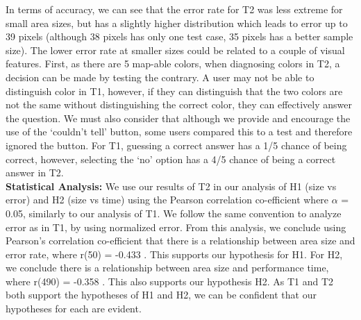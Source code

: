 In terms of accuracy, we can see that the error rate for T2 was less extreme for small area sizes, but has a slightly higher distribution which leads to error up to 39 pixels (although 38 pixels has only one test case, 35 pixels has a better sample size). The lower error rate at smaller sizes could be related to a couple of visual features. First, as there are 5 map-able colors, when diagnosing colors in T2, a decision can be made by testing the contrary. A user may not be able to distinguish color in T1, however, if they can distinguish that the two colors are not the same without distinguishing the correct color, they can effectively answer the question. We must also consider that although we provide and encourage the use of the `couldn't tell' button, some users compared this to a test and therefore ignored the button. For T1, guessing a correct answer has a 1/5 chance of being correct, however, selecting the `no' option has a 4/5 chance of being a correct answer in T2.\\
\textbf{Statistical Analysis: } We use our results of T2 in our analysis of H1 (size vs error) and H2 (size vs time) using the Pearson correlation co-efficient where $\alpha$ = 0.05, similarly to our analysis of T1. We follow the same convention to analyze error as in T1, by using normalized error. From this analysis, we conclude using Pearson's correlation co-efficient that there is a relationship between area size and error rate, where r(50) = -0.433%
. This supports our hypothesis for H1. For H2, we conclude there is a relationship between area size and performance time, where r(490) = -0.358%
. This also supports our hypothesis H2. As T1 and T2 both support the hypotheses of H1 and H2, we can be confident that our hypotheses for each are evident.
